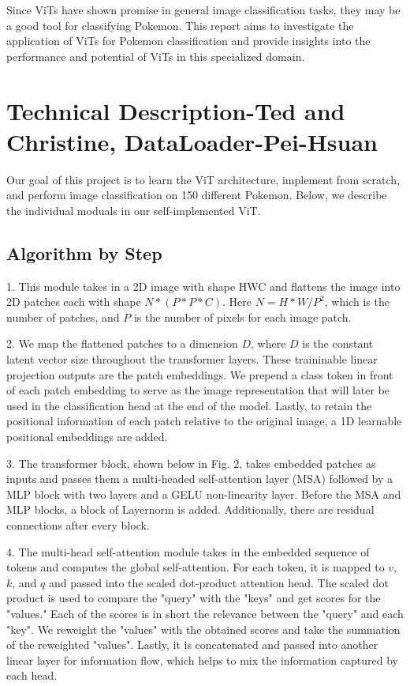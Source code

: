 \documentclass{article} %
\begin{document}
Since ViTs have shown promise in general image classification tasks, they may be a good 
tool for classifying Pokemon. This report aims to investigate the application of ViTs for 
Pokemon classification and provide insights into the performance and potential of ViTs in 
this specialized domain.

\section{Technical Description-Ted and Christine, DataLoader-Pei-Hsuan}
\label{gen_inst}

Our goal of this project is to learn the ViT architecture, implement from scratch, and
perform image classification on 150 different Pokemon. Below, we describe the individual 
moduals in our self-implemented ViT.

\subsection{Algorithm by Step}

1. This module takes in a 2D image with shape HWC and flattens the image into 2D patches each with shape $N * (P * P * C)$.
Here $N = {H * W} / {P^2}$, which is the number of patches, and $P$ is the number of pixels for each image patch.

2. We map the flattened patches to a dimension $D$, where $D$ is the constant latent vector size throughout the transformer layers.
These traininable linear projection outputs are the patch embeddings.
We prepend a class token in front of each patch embedding to serve as the image representation that will later be used in the
classification head at the end of the model. Lastly, to retain the positional information of each patch relative to the original image,
a 1D learnable positional embeddings are added.

3. The transformer block, shown below in Fig. 2, takes embedded patches as inputs and passes them a multi-headed self-attention layer (MSA)
followed by a MLP block with two layers and a GELU non-linearity layer. Before the MSA and MLP blocks, a block of Layernorm is added.
Additionally, there are residual connections after every block.

4. The multi-head self-attention module takes in the embedded sequence of tokens and computes the global self-attention.
For each token, it is mapped to $v$, $k$, and $q$ and passed into the scaled dot-product attention head.
The scaled dot product is used to compare the "query" with the "keys" and get scores for the "values."
Each of the scores is in short the relevance between the "query" and each "key".
We reweight the "values" with the obtained scores and take the summation of the reweighted "values".
Lastly, it is concatenated and passed into another linear layer for information flow, which helps to mix the information captured by each head.
\end{document}
